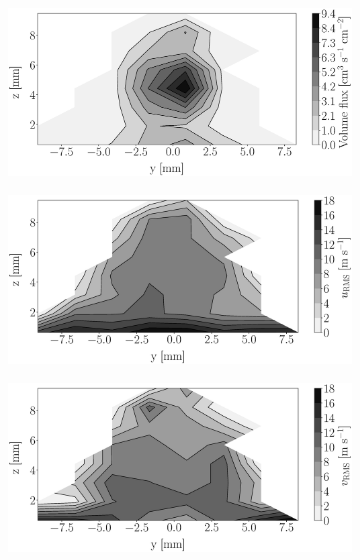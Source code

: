 \begin{figure}[h!]
\begin{subfigure}[b]{0.22\textwidth}
	\centering
   \includegraphics[scale=0.17]{./part2_developments/figures_ch5_resolved_JICF/injectors_SLI/uG100_dx20_x15_volume_flux_map.eps}
\end{subfigure}
   \hspace{0.17in}
\begin{subfigure}[b]{0.22\textwidth}
	\centering
   \includegraphics[scale=0.17]{./part2_developments/figures_ch5_resolved_JICF/injectors_SLI/uG100_dx20_x15_ux_rms_map.eps}
\end{subfigure}
   \hspace{0.17in}
\begin{subfigure}[b]{0.22\textwidth}
	\centering
   \includegraphics[scale=0.17]{./part2_developments/figures_ch5_resolved_JICF/injectors_SLI/uG100_dx20_x15_uy_rms_map.eps}

\end{subfigure}
\end{figure}
